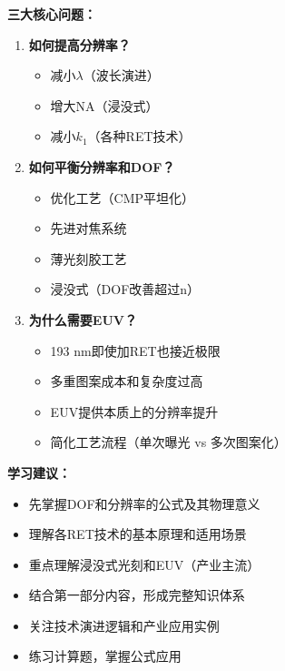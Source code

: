 \documentclass[UTF8,12pt,a4paper]{ctexart}
\begin{document}
\textbf{三大核心问题：}
\begin{enumerate}
    \item \textbf{如何提高分辨率？}
    \begin{itemize}
        \item 减小$\lambda$（波长演进）
        \item 增大NA（浸没式）
        \item 减小$k_1$（各种RET技术）
    \end{itemize}
    
    \item \textbf{如何平衡分辨率和DOF？}
    \begin{itemize}
        \item 优化工艺（CMP平坦化）
        \item 先进对焦系统
        \item 薄光刻胶工艺
        \item 浸没式（DOF改善超过n）
    \end{itemize}
    
    \item \textbf{为什么需要EUV？}
    \begin{itemize}
        \item 193 nm即使加RET也接近极限
        \item 多重图案成本和复杂度过高
        \item EUV提供本质上的分辨率提升
        \item 简化工艺流程（单次曝光 vs 多次图案化）
    \end{itemize}
\end{enumerate}

\textbf{学习建议：}
\begin{itemize}
    \item 先掌握DOF和分辨率的公式及其物理意义
    \item 理解各RET技术的基本原理和适用场景
    \item 重点理解浸没式光刻和EUV（产业主流）
    \item 结合第一部分内容，形成完整知识体系
    \item 关注技术演进逻辑和产业应用实例
    \item 练习计算题，掌握公式应用
\end{itemize}
\end{document}
